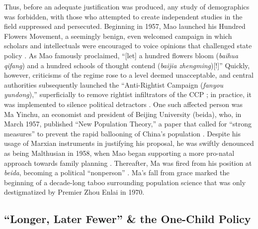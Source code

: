 \documentclass[12pt, a4paper, twoside]{article}
\begin{document}
Thus, before an adequate justification was produced, any study of demographics was forbidden, with those who attempted to create independent studies in the field suppressed and persecuted. Beginning in 1957, Mao launched his Hundred Flowers Movement, a seemingly benign, even welcomed campaign in which scholars and intellectuals were encouraged to voice opinions that challenged state policy \autocite[pp.\ 7--12]{WangEtAl2016AJS}. As Mao famously proclaimed, “[let] a hundred flowers bloom (\emph{baihua qifang}) and a hundred schools of thought contend (\emph{baijia zhengming})[!]” Quickly, however, criticisms of the regime rose to a level deemed unacceptable, and central authorities subsequently launched the “Anti-Rightist Campaign (\emph{fanyou yundong}),” superficially to remove rightist infiltrators of the CCP \autocite{ShaShangzhi2020}; in practice, it was implemented to silence political detractors \autocite[p.\ 3]{Vidal2016AntiRightist}. One such affected person was Ma Yinchu, an economist and president of Beijing University (beida), who, in March 1957, published “New Population Theory,” a paper that called for “strong measures” to prevent the rapid ballooning of China’s population \autocite[pp.\ 56--57]{Greenhalgh2008JustOneChild}. Despite his usage of Marxian instruments in justifying his proposal, he was swiftly denounced as being Malthusian in 1958, when Mao began supporting a more pro-natal approach towards family planning \autocite[p.\ 57]{Greenhalgh2008JustOneChild}. Thereafter, Ma was fired from his position at \emph{beida}, becoming a political “nonperson” \autocite[p.\ 687]{Tien1981DemographyInChina}. Ma’s fall from grace marked the beginning of a decade-long taboo surrounding population science that was only destigmatized by Premier Zhou Enlai in 1970. 

\subsection{``Longer, Later Fewer'' \& the One-Child Policy}
\end{document}
